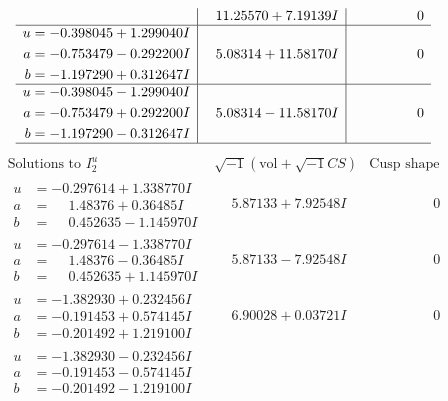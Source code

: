 \documentclass[1p]{elsarticle_modified}
\theoremstyle{definition}
\newcommand{\I}{\sqrt{-1}}
\begin{document}
$$\begin{array}{c|c|c}
 & \phantom{-}11.25570 + 7.19139 I & \phantom{-0.000000 } 0 \\ \hline\begin{aligned}
u &= -0.398045 + 1.299040 I \\
a &= -0.753479 - 0.292200 I \\
b &= -1.197290 + 0.312647 I\end{aligned}
 & \phantom{-}5.08314 + 11.58170 I & \phantom{-0.000000 } 0 \\ \hline\begin{aligned}
u &= -0.398045 - 1.299040 I \\
a &= -0.753479 + 0.292200 I \\
b &= -1.197290 - 0.312647 I\end{aligned}
 & \phantom{-}5.08314 - 11.58170 I & \phantom{-0.000000 } 0\\
 \hline 
 \end{array}$$\newpage$$\begin{array}{c|c|c}  
\text{Solutions to }I^u_{2}& \I (\text{vol} + \sqrt{-1}CS) & \text{Cusp shape}\\
 \hline 
\begin{aligned}
u &= -0.297614 + 1.338770 I \\
a &= \phantom{-}1.48376 + 0.36485 I \\
b &= \phantom{-}0.452635 - 1.145970 I\end{aligned}
 & \phantom{-}5.87133 + 7.92548 I & \phantom{-0.000000 } 0 \\ \hline\begin{aligned}
u &= -0.297614 - 1.338770 I \\
a &= \phantom{-}1.48376 - 0.36485 I \\
b &= \phantom{-}0.452635 + 1.145970 I\end{aligned}
 & \phantom{-}5.87133 - 7.92548 I & \phantom{-0.000000 } 0 \\ \hline\begin{aligned}
u &= -1.382930 + 0.232456 I \\
a &= -0.191453 + 0.574145 I \\
b &= -0.201492 + 1.219100 I\end{aligned}
 & \phantom{-}6.90028 + 0.03721 I & \phantom{-0.000000 } 0 \\ \hline\begin{aligned}
u &= -1.382930 - 0.232456 I \\
a &= -0.191453 - 0.574145 I \\
b &= -0.201492 - 1.219100 I\end{aligned}

\end{array}$$
\end{document}
